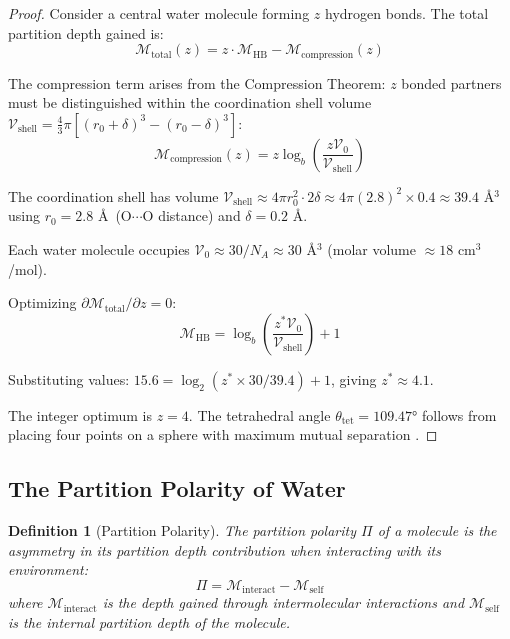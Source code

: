 \documentclass[twocolumn,10pt]{article}
\newtheorem{definition}[theorem]{Definition}
\theoremstyle{remark}
\newcommand{\Depth}{\mathcal{M}}
\begin{document}
\begin{proof}
Consider a central water molecule forming $z$ hydrogen bonds. The total partition depth gained is:
\begin{equation}
    \Depth_{\text{total}}(z) = z \cdot \Depth_{\text{HB}} - \Depth_{\text{compression}}(z)
\end{equation}

The compression term arises from the Compression Theorem: $z$ bonded partners must be distinguished within the coordination shell volume $\mathcal{V}_{\text{shell}} = \frac{4}{3}\pi[(r_0 + \delta)^3 - (r_0 - \delta)^3]$:
\begin{equation}
    \Depth_{\text{compression}}(z) = z \log_b\left(\frac{z \mathcal{V}_0}{\mathcal{V}_{\text{shell}}}\right)
\end{equation}

The coordination shell has volume $\mathcal{V}_{\text{shell}} \approx 4\pi r_0^2 \cdot 2\delta \approx 4\pi (2.8)^2 \times 0.4 \approx 39.4$ \AA$^3$ using $r_0 = 2.8$ \AA\ (O$\cdots$O distance) and $\delta = 0.2$ \AA.

Each water molecule occupies $\mathcal{V}_0 \approx 30/N_A \approx 30$ \AA$^3$ (molar volume $\approx 18$ cm$^3$/mol).

Optimizing $\partial \Depth_{\text{total}}/\partial z = 0$:
\begin{equation}
    \Depth_{\text{HB}} = \log_b\left(\frac{z^* \mathcal{V}_0}{\mathcal{V}_{\text{shell}}}\right) + 1
\end{equation}

Substituting values: $15.6 = \log_2(z^* \times 30/39.4) + 1$, giving $z^* \approx 4.1$.

The integer optimum is $z = 4$. The tetrahedral angle $\theta_{\text{tet}} = 109.47°$ follows from placing four points on a sphere with maximum mutual separation \cite{stillinger1974}.
\end{proof}

\subsection{The Partition Polarity of Water}

\begin{definition}[Partition Polarity]
\label{def:polarity}
The \emph{partition polarity} $\Pi$ of a molecule is the asymmetry in its partition depth contribution when interacting with its environment:
\begin{equation}
    \Pi = \Depth_{\text{interact}} - \Depth_{\text{self}}
\end{equation}
where $\Depth_{\text{interact}}$ is the depth gained through intermolecular interactions and $\Depth_{\text{self}}$ is the internal partition depth of the molecule.
\end{definition}
\end{document}
